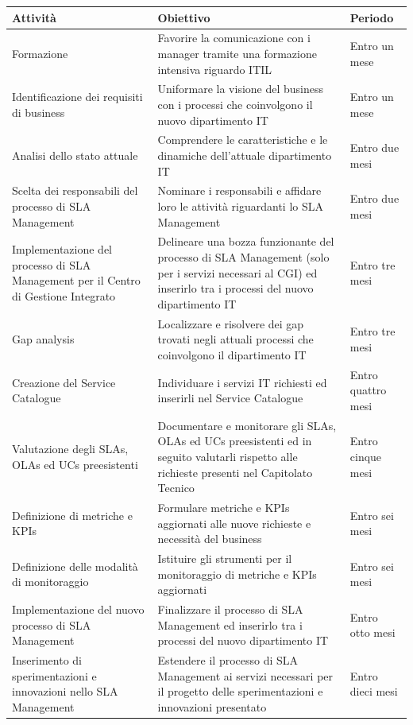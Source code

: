 \begin{center}
    \begin{tabular}{ | p{4cm} | p{5cm} | l | }
    \hline
    Attività & Obiettivo & Periodo \\ 
    \hline
    
    Formazione & Favorire la comunicazione con i manager tramite una formazione intensiva riguardo ITIL & Entro un mese \\ 
    \hline
    Identificazione dei requisiti di business & Uniformare la visione del business con i processi che coinvolgono il nuovo dipartimento IT & Entro un mese \\ 
    \hline
    Analisi dello stato attuale & Comprendere le caratteristiche e le dinamiche dell'attuale dipartimento IT & Entro due mesi \\
    \hline
    Scelta dei responsabili del processo di SLA Management & Nominare i responsabili e affidare loro le attività riguardanti lo SLA Management & Entro due mesi \\
    \hline
    Implementazione del processo di SLA Management per il Centro di Gestione Integrato & Delineare una bozza funzionante del processo di SLA Management (solo per i servizi necessari al CGI) ed inserirlo tra i processi del nuovo dipartimento IT & Entro tre mesi \\
    \hline
    Gap analysis & Localizzare e risolvere dei gap trovati negli attuali processi che coinvolgono il dipartimento IT & Entro tre mesi \\
    \hline
    Creazione del Service Catalogue & Individuare i servizi IT richiesti ed inserirli nel Service Catalogue & Entro quattro mesi \\
    \hline
    Valutazione degli SLAs, OLAs ed UCs preesistenti & Documentare e monitorare gli SLAs, OLAs ed UCs preesistenti ed in seguito valutarli rispetto alle richieste presenti nel Capitolato Tecnico & Entro cinque mesi \\
    \hline
    Definizione di metriche e KPIs & Formulare metriche e KPIs aggiornati alle nuove richieste e necessità del business & Entro sei mesi \\
    \hline
    Definizione delle modalità di monitoraggio & Istituire gli strumenti per il monitoraggio di metriche e KPIs aggiornati & Entro sei mesi \\
    \hline
    Implementazione del nuovo processo di SLA Management & Finalizzare il processo di SLA Management ed inserirlo tra i processi del nuovo dipartimento IT & Entro otto mesi \\
    \hline
    Inserimento di sperimentazioni e innovazioni nello SLA Management & Estendere il processo di SLA Management ai servizi necessari per il progetto delle sperimentazioni e innovazioni presentato & Entro dieci mesi \\
    \hline
    
    \end{tabular}
\end{center}


